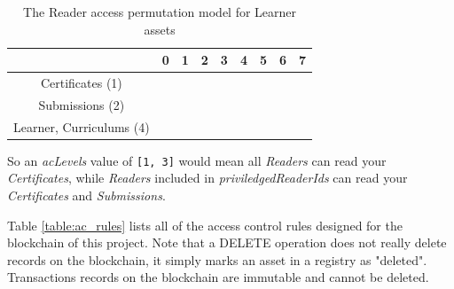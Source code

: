 \begin{table}[!ht]
	\caption{The Reader access permutation model for Learner assets}
	\centering
	\label{table:reader_permutations}
	\begin{tabular}{|c|c|c|c|c|c|c|c|c|}
		\hline
		                     & 0 & 1          & 2          & 3          & 4          & 5          & 6          & 7          \\
		\hline
		Certificates (1)         &   & \checkmark &            & \checkmark &            & \checkmark &            & \checkmark \\
		\hline
		Submissions (2)          &   &            & \checkmark & \checkmark &            &            & \checkmark & \checkmark \\
		\hline
		Learner, Curriculums (4) &   &            &            &            & \checkmark & \checkmark & \checkmark & \checkmark \\
		\hline
	\end{tabular}
\end{table}

So an \textit{acLevels} value of \texttt{[1, 3]} would mean all \textit{Readers} can read your \textit{Certificates},
while \textit{Readers} included in \textit{priviledgedReaderIds} can read your \textit{Certificates} and \textit{Submissions}.

Table \ref{table:ac_rules} lists all of the access control rules designed for the blockchain of this project.
Note that a DELETE operation does not really delete records on the blockchain, it simply marks an asset in a registry as "deleted". 
Transactions records on the blockchain are immutable and cannot be deleted.

